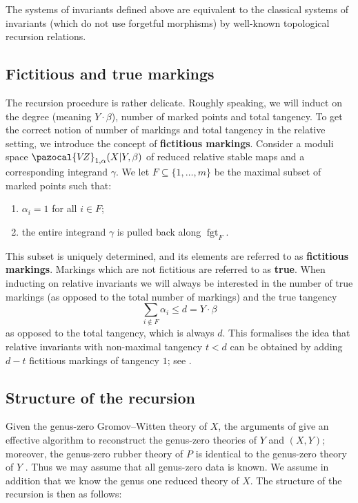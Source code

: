 \documentclass[11pt]{amsart}
\newcommand{\VZ}{\pazocal{V\!Z}}
\newcommand{\fgt}{\operatorname{fgt}}
\theoremstyle{definition}
\theoremstyle{definition}
\begin{document}
The systems of invariants defined above are equivalent to the classical systems of invariants (which do not use forgetful morphisms) by well-known topological recursion relations.

\subsection{Fictitious and true markings} The recursion procedure is rather delicate. Roughly speaking, we will induct on the degree (meaning $Y\cdot\beta$), number of marked points and total tangency. To get the correct notion of number of markings and total tangency in  the relative setting, we introduce the concept of \textbf{fictitious markings}. Consider a moduli space $\VZ_{1,\alpha}(X|Y,\beta)$ of reduced relative stable maps and a corresponding integrand $\gamma$. We let $F \subseteq \{1,\ldots,m\}$ be the maximal subset of marked points such that:
\begin{enumerate}
\item $\alpha_i = 1$ for all $i \in F$;
\item the entire integrand $\gamma$ is pulled back along $\fgt_F$.
\end{enumerate}
This subset is uniquely determined, and its elements are referred to as \textbf{fictitious markings}. Markings which are not fictitious are referred to as \textbf{true}. When inducting on relative invariants we will always be interested in the number of true markings (as opposed to the total number of markings) and the true tangency
\begin{equation*} \sum_{i \not\in F} \alpha_i \leq d=Y\cdot \beta \end{equation*}
as opposed to the total tangency, which is always $d$. This formalises the idea that relative invariants with non-maximal tangency $t<d$ can be obtained by adding $d-t$ fictitious markings of tangency $1$; see \cite[Lemma 1.15(i)]{Ga}.

\subsection{Structure of the recursion} Given the genus-zero Gromov--Witten theory of $X$, the arguments of \cite{Ga} give an effective algorithm to reconstruct the genus-zero theories of $Y$ and $(X,Y)$; moreover, the genus-zero rubber theory of $P$ is identical to the genus-zero theory of $Y$ \cite{GathmannThesis}. Thus we may assume that all genus-zero data is known. We assume in addition that we know the genus one reduced theory of $X$. The structure of the recursion is then as follows:
\end{document}
